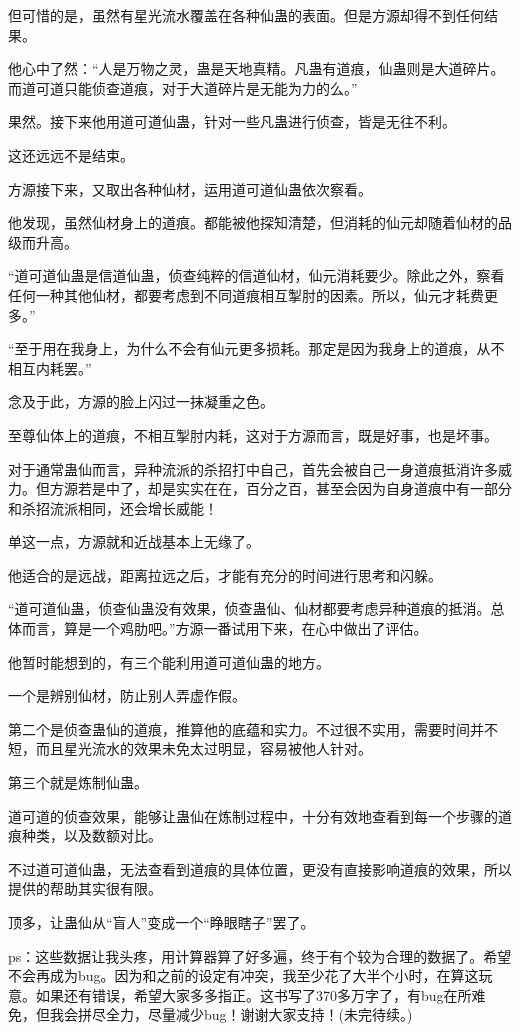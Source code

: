 \begin{this_body}
但可惜的是，虽然有星光流水覆盖在各种仙蛊的表面。但是方源却得不到任何结果。

他心中了然：“人是万物之灵，蛊是天地真精。凡蛊有道痕，仙蛊则是大道碎片。而道可道只能侦查道痕，对于大道碎片是无能为力的么。”

果然。接下来他用道可道仙蛊，针对一些凡蛊进行侦查，皆是无往不利。

这还远远不是结束。

方源接下来，又取出各种仙材，运用道可道仙蛊依次察看。

他发现，虽然仙材身上的道痕。都能被他探知清楚，但消耗的仙元却随着仙材的品级而升高。

“道可道仙蛊是信道仙蛊，侦查纯粹的信道仙材，仙元消耗要少。除此之外，察看任何一种其他仙材，都要考虑到不同道痕相互掣肘的因素。所以，仙元才耗费更多。”

“至于用在我身上，为什么不会有仙元更多损耗。那定是因为我身上的道痕，从不相互内耗罢。”

念及于此，方源的脸上闪过一抹凝重之色。

至尊仙体上的道痕，不相互掣肘内耗，这对于方源而言，既是好事，也是坏事。

对于通常蛊仙而言，异种流派的杀招打中自己，首先会被自己一身道痕抵消许多威力。但方源若是中了，却是实实在在，百分之百，甚至会因为自身道痕中有一部分和杀招流派相同，还会增长威能！

单这一点，方源就和近战基本上无缘了。

他适合的是远战，距离拉远之后，才能有充分的时间进行思考和闪躲。

“道可道仙蛊，侦查仙蛊没有效果，侦查蛊仙、仙材都要考虑异种道痕的抵消。总体而言，算是一个鸡肋吧。”方源一番试用下来，在心中做出了评估。

他暂时能想到的，有三个能利用道可道仙蛊的地方。

一个是辨别仙材，防止别人弄虚作假。

第二个是侦查蛊仙的道痕，推算他的底蕴和实力。不过很不实用，需要时间并不短，而且星光流水的效果未免太过明显，容易被他人针对。

第三个就是炼制仙蛊。

道可道的侦查效果，能够让蛊仙在炼制过程中，十分有效地查看到每一个步骤的道痕种类，以及数额对比。

不过道可道仙蛊，无法查看到道痕的具体位置，更没有直接影响道痕的效果，所以提供的帮助其实很有限。

顶多，让蛊仙从“盲人”变成一个“睁眼瞎子”罢了。

ps：这些数据让我头疼，用计算器算了好多遍，终于有个较为合理的数据了。希望不会再成为bug。因为和之前的设定有冲突，我至少花了大半个小时，在算这玩意。如果还有错误，希望大家多多指正。这书写了370多万字了，有bug在所难免，但我会拼尽全力，尽量减少bug！谢谢大家支持！(未完待续。)

\end{this_body}

